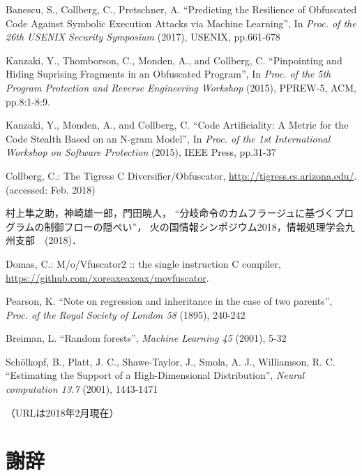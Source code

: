 \documentclass[12pt]{jarticle}
\begin{document}
\newpage

\renewcommand{\refname}{参考文献・参考URL}
\begin{thebibliography}{9}
Banescu, S., Collberg, C., Pretschner, A.
``Predicting the Resilience of Obfuscated Code Against Symbolic Execution Attacks via Machine Learning'',
In \textit{Proc. of the 26th USENIX Security Symposium} (2017), USENIX, pp.661-678

Kanzaki, Y., Thomborson, C., Monden, A., and Collberg, C.
``Pinpointing and Hiding Suprising Fragments in an Obfuscated Program'',
In \textit{Proc. of the 5th Program Protection and Reverse Engineering Workshop} (2015), PPREW-5, ACM, pp.8:1-8:9.

Kanzaki, Y., Monden, A., and Collberg, C.
``Code Artificiality: A Metric for the Code Stealth Based on an N-gram Model'',
In \textit{Proc. of the 1st International Workshop on Software Protection} (2015), IEEE Press, pp.31-37

Collberg, C.: The Tigress C Diversifier/Obfuscator,
\url{http://tigress.cs.arizona.edu/}. (accessed: Feb. 2018)

村上隼之助，神崎雄一郎，門田暁人， 
``分岐命令のカムフラージュに基づくプログラムの制御フローの隠ぺい''，
火の国情報シンポジウム2018，情報処理学会九州支部　(2018)．

Domas, C.: M/o/Vfuscator2 :: the single instruction C compiler,
\url{https://github.com/xoreaxeaxeax/movfuscator}.

Pearson, K.
``Note on regression and inheritance in the case of two parents'',
\textit{Proc. of the Royal Society of London 58} (1895), 240-242

Breiman, L.
``Random forests'',
\textit{Machine Learning 45} (2001), 5-32

Sch\"{o}lkopf, B., Platt, J. C., Shawe-Taylor, J., Smola, A. J., Williamson, R. C.
``Estimating the Support of a High-Dimensional Distribution'',
\textit{Neural computation 13.7} (2001), 1443-1471
\end{thebibliography}
\noindent （URLは2018年2月現在）

\newpage
\section*{謝辞}
\end{document}
